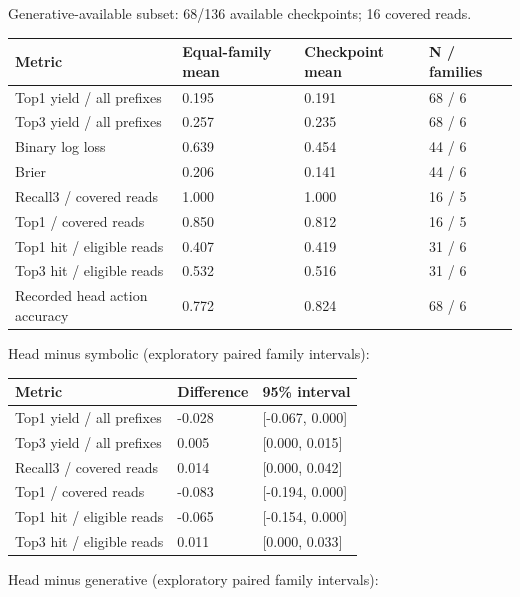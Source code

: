\documentclass[10pt]{article}
\begin{document}
Generative-available subset: 68/136 available checkpoints; 16 covered reads.

\begin{longtable}[]{@{}llll@{}}
\toprule\noalign{}
Metric & Equal-family mean & Checkpoint mean & N / families \\
\midrule\noalign{}
\endhead
\bottomrule\noalign{}
\endlastfoot
Top1 yield / all prefixes & 0.195 & 0.191 & 68 / 6 \\
Top3 yield / all prefixes & 0.257 & 0.235 & 68 / 6 \\
Binary log loss & 0.639 & 0.454 & 44 / 6 \\
Brier & 0.206 & 0.141 & 44 / 6 \\
Recall3 / covered reads & 1.000 & 1.000 & 16 / 5 \\
Top1 / covered reads & 0.850 & 0.812 & 16 / 5 \\
Top1 hit / eligible reads & 0.407 & 0.419 & 31 / 6 \\
Top3 hit / eligible reads & 0.532 & 0.516 & 31 / 6 \\
Recorded head action accuracy & 0.772 & 0.824 & 68 / 6 \\
\end{longtable}

Head minus symbolic (exploratory paired family intervals):

\begin{longtable}[]{@{}lll@{}}
\toprule\noalign{}
Metric & Difference & 95\% interval \\
\midrule\noalign{}
\endhead
\bottomrule\noalign{}
\endlastfoot
Top1 yield / all prefixes & -0.028 & {[}-0.067, 0.000{]} \\
Top3 yield / all prefixes & 0.005 & {[}0.000, 0.015{]} \\
Recall3 / covered reads & 0.014 & {[}0.000, 0.042{]} \\
Top1 / covered reads & -0.083 & {[}-0.194, 0.000{]} \\
Top1 hit / eligible reads & -0.065 & {[}-0.154, 0.000{]} \\
Top3 hit / eligible reads & 0.011 & {[}0.000, 0.033{]} \\
\end{longtable}

Head minus generative (exploratory paired family intervals):
\end{document}

